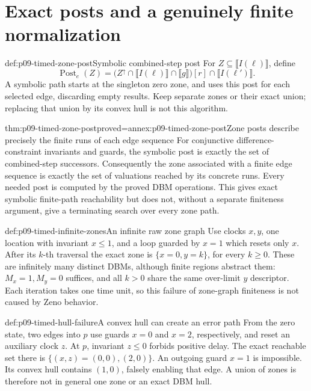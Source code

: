 \section{Exact posts and a genuinely finite normalization}
\label{sec:p09-timed-zone-reachability}

\begin{hbdefinition}{def:p09-timed-zone-post}{Symbolic combined-step post}
For \(Z\subseteq\llbracket I(\ell)\rrbracket\), define
\[
 \operatorname{Post}_e(Z)=
    \bigl(Z^\uparrow\cap\llbracket I(\ell)\rrbracket
                         \cap\llbracket g\rrbracket\bigr)[r]
                         \cap\llbracket I(\ell')\rrbracket.
\]
A symbolic path starts at the singleton zero zone, and uses this post for
each selected edge, discarding empty results. Keep separate zones or their
exact union; replacing that union by its convex hull is not this algorithm.
\end{hbdefinition}

\begin{hbtheorem}{thm:p09-timed-zone-post}{proved=annex:p09-timed-zone-post}{Zone posts describe precisely the finite runs of each edge sequence}
For conjunctive difference-constraint invariants and guards, the symbolic
post is exactly the set of combined-step successors. Consequently the
zone associated with a finite edge sequence is exactly the set of valuations
reached by its concrete runs. Every needed post is computed by the proved
DBM operations. This gives exact symbolic finite-path reachability but
does not, without a separate finiteness argument, give a terminating search
over every zone path.
\end{hbtheorem}

\begin{hbexample}{def:p09-timed-infinite-zones}{An infinite raw zone graph}
Use clocks \(x,y\), one location with invariant \(x\leq1\), and a loop
guarded by \(x=1\) which resets only \(x\). After its \(k\)-th traversal
the exact zone is \(\{x=0,y=k\}\), for every \(k\geq0\). These are
infinitely many distinct DBMs, although finite regions abstract them:
\(M_x=1,M_y=0\) suffices, and all \(k>0\) share the same over-limit
\(y\) descriptor. Each iteration takes one time unit, so this failure
of zone-graph finiteness is not caused by Zeno behavior.
\end{hbexample}

\begin{hbexample}{def:p09-timed-hull-failure}{A convex hull can create an error path}
From the zero state, two edges into \(p\) use guards \(x=0\) and \(x=2\),
respectively, and reset an auxiliary clock \(z\). At \(p\), invariant
\(z\leq0\) forbids positive delay. The exact reachable set there is
\(\{(x,z)=(0,0),(2,0)\}\). An outgoing guard \(x=1\) is impossible.
Its convex hull contains \((1,0)\), falsely enabling that edge. A union
of zones is therefore not in general one zone or an exact DBM hull.
\end{hbexample}

